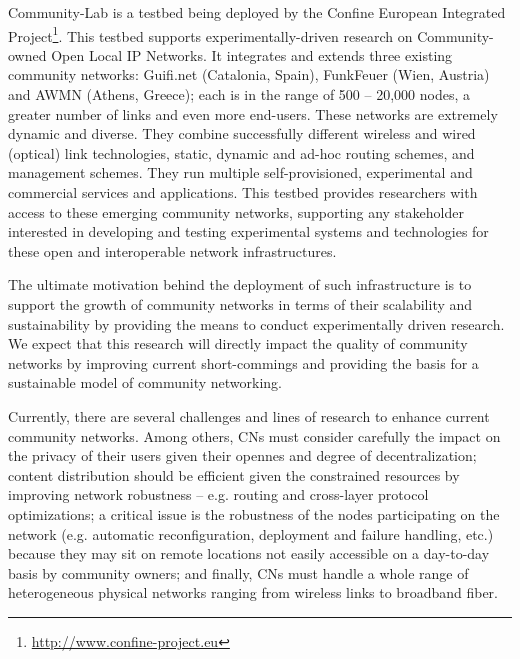 \documentclass[conference]{IEEEtran}
\begin{document}
Community-Lab is a testbed being deployed by the Confine European
Integrated Project\footnote{\url{http://www.confine-project.eu}}. This testbed supports experimentally-driven research
on Community-owned Open Local IP Networks. It integrates and extends 
three existing community networks: Guifi.net (Catalonia, Spain),
FunkFeuer (Wien, Austria) and AWMN (Athens, Greece); each is in the
range of 500 -- 20,000 nodes, a greater number of links and even more end-users.
These networks are extremely dynamic and diverse. They combine
successfully different wireless and wired (optical) link technologies, static, dynamic
and ad-hoc routing schemes, and management schemes. They run multiple
self-provisioned, experimental and commercial services and applications.
This testbed provides researchers with access to these emerging
community networks, supporting any stakeholder interested in developing
and testing experimental systems and technologies for these open
and interoperable network infrastructures.


The ultimate motivation behind the deployment of such infrastructure is 
to support the growth of community networks in terms of their scalability and
sustainability by providing the means to conduct experimentally driven research. 
We expect that this research will directly impact the quality of community networks
by improving current short-commings and providing the basis for a sustainable
model of community networking.


Currently, there are several challenges and lines of research to enhance current
community networks. Among others, CNs must consider carefully the impact on the privacy of their
users given their opennes and degree of decentralization; content distribution 
should be efficient given the constrained resources by improving network robustness 
-- e.g. routing and cross-layer protocol optimizations; a critical issue is the
robustness of the nodes participating on the network (e.g. automatic reconfiguration,
deployment and failure handling, etc.) because they may sit on remote locations not
easily accessible on a day-to-day basis by community owners; and finally, CNs must handle a whole range
of heterogeneous physical networks ranging from wireless links to broadband fiber.
\end{document}
